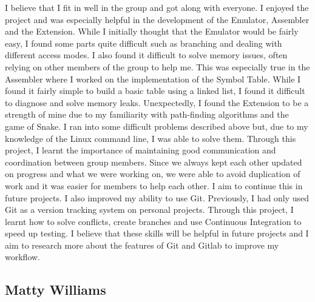 \documentclass[11pt]{article}
\begin{document}
I believe that I fit in well in the group and got along with everyone. I enjoyed the project and was especially helpful in the development of the Emulator, Assembler and the Extension. 
While I initially thought that the Emulator would be fairly easy, I found some parts quite difficult such as branching and dealing with different access modes. 
I also found it difficult to solve memory issues, often relying on other members of the group to help me. This was especially true in the Assembler where I worked on 
the implementation of the Symbol Table. While I found it fairly simple to build a basic table using a linked list, I found it difficult to diagnose and solve memory leaks. 
Unexpectedly, I found the Extension to be a strength of mine due to my familiarity with path-finding algorithms and the game of Snake. I ran into some difficult 
problems described above but, due to my knowledge of the Linux command line, I was able to solve them.
\newline
Through this project, I learnt the importance of maintaining good communication and coordination between group members. Since we always kept each other updated 
on progress and what we were working on, we were able to avoid duplication of work and it was easier for members to help each other. I aim to continue this in 
future projects. I also improved my ability to use Git. Previously, I had only used Git as a version tracking system on personal projects. Through this project, 
I learnt how to solve conflicts, create branches and use Continuous Integration to speed up testing. I believe that these skills will be helpful in future projects 
and I aim to research more about the features of Git and Gitlab to improve my workflow.

\subsection{Matty Williams}
\end{document}

